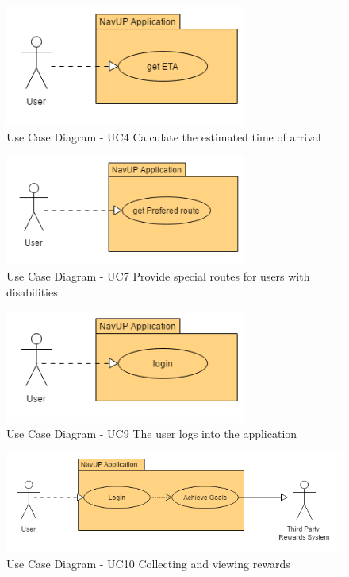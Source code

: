 		 \graphicspath{ {./Images/User/} }
		\begin{figure}[h]
		\caption{Use Case Diagram - UC4  Calculate the estimated time of arrival}
		\includegraphics[width = 300px]{CalculateETA.png}
		\end{figure}
		\graphicspath{ {./Images/User/} }
		\begin{figure}[h]
		\caption{Use Case Diagram - UC7  Provide special routes for users with disabilities}
		\includegraphics[width = 300px]{getPreferedRoute.png}
		\end{figure}


		\graphicspath{ {./Images/User/} }
		\begin{figure}[h]
		\caption{Use Case Diagram -  UC9 The user logs into the application}
		\includegraphics[width = 300px]{Login.png}
		\end{figure}

		\graphicspath{ {./Images/User/} }
		\begin{figure}[h]
		\caption{Use Case Diagram - UC10 Collecting and viewing rewards}
		\includegraphics[width = 500px]{GetRewards.png}
		\end{figure}

